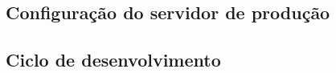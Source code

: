 \subsection*{Configuração do servidor de produção}

\subsection*{Ciclo de desenvolvimento}











